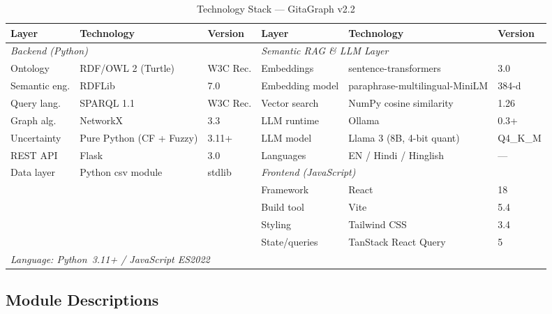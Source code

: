 \documentclass[conference]{IEEEtran}
\begin{document}
\begin{table}[!t]
\caption{Technology Stack — GitaGraph v2.2}
\label{tab:tech}
\centering
\begin{tabular}{@{}l l l  l l l@{}}
\toprule
\textbf{Layer} & \textbf{Technology} & \textbf{Version} &
\textbf{Layer} & \textbf{Technology} & \textbf{Version} \\
\midrule
\multicolumn{3}{l}{\textit{Backend (Python)}} & \multicolumn{3}{l}{\textit{Semantic RAG \& LLM Layer}} \\
Ontology       & RDF/OWL 2 (Turtle)       & W3C Rec.       & Embeddings        & sentence-transformers     & 3.0 \\
Semantic eng.  & RDFLib                   & 7.0            & Embedding model   & paraphrase-multilingual-MiniLM & 384-d \\
Query lang.    & SPARQL 1.1               & W3C Rec.       & Vector search     & NumPy cosine similarity    & 1.26 \\
Graph alg.     & NetworkX                 & 3.3            & LLM runtime       & Ollama                    & 0.3+ \\
Uncertainty    & Pure Python (CF + Fuzzy) & 3.11+          & LLM model         & Llama 3 (8B, 4-bit quant) & Q4\_K\_M \\
REST API       & Flask                    & 3.0            & Languages         & EN / Hindi / Hinglish     & — \\
Data layer        & Python csv module          & stdlib            & \multicolumn{3}{l}{\textit{Frontend (JavaScript)}} \\
               &                          &                & Framework         & React                     & 18 \\
\multicolumn{3}{l}{}                                     & Build tool        & Vite                      & 5.4 \\
\multicolumn{3}{l}{}                                     & Styling           & Tailwind CSS              & 3.4 \\
\multicolumn{3}{l}{}                                     & State/queries     & TanStack React Query      & 5 \\
\midrule
\multicolumn{6}{l}{\textit{Language: Python~3.11+ / JavaScript ES2022}} \\
\bottomrule
\end{tabular}
\end{table}

\subsection{Module Descriptions}
\end{document}

